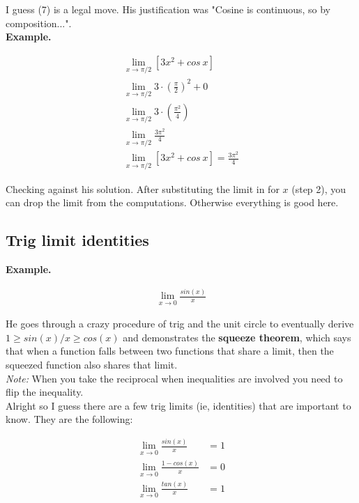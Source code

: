\documentclass{article}
\begin{document}
I guess (7) is a legal move. His justification was "Cosine is continuous, so by
composition...".\\

\textbf{Example.}

\begin{align*}
    \lim_{x\to \pi/2} [3x^2 + cos~x]\\
    \lim_{x\to \pi/2} 3 \cdot \left( \frac{\pi}{2} \right)^2 + 0\\
    \lim_{x \to \pi/2} 3 \cdot \left( \frac{\pi^2}{4} \right)\\
    \lim_{x \to \pi/2} \frac{3\pi^2}{4}\\
    \lim_{x\to \pi/2} [3x^2 + cos~x] = \frac{3\pi^2}{4}
\end{align*}

Checking against his solution. After substituting the limit in for $x$ (step 2), you can
drop the limit from the computations. Otherwise everything is good here.\\

\subsection{Trig limit identities}

\textbf{Example.}

\begin{align*}
    \lim_{x\to 0} \frac{sin(x)}{x}
\end{align*}

He goes through a crazy procedure of trig and the unit circle to eventually derive $1 \geq
sin(x) / x \geq cos(x)$ and demonstrates the \textbf{squeeze theorem}, which says that
when a function falls between two functions that share a limit, then the squeezed function
also shares that limit. \\

\emph{Note:} When you take the reciprocal when inequalities are involved you need to flip
the inequality.\\

Alright so I guess there are a few trig limits (ie, identities) that are important to
know. They are the following:

\begin{align*}
    \lim_{x\to 0} \frac{sin(x)}{x} &= 1 \\
    \lim_{x\to 0} \frac{1 - cos(x)}{x} &= 0\\
    \lim_{x\to 0} \frac{tan(x)}{x} &= 1
\end{align*}
\end{document}

